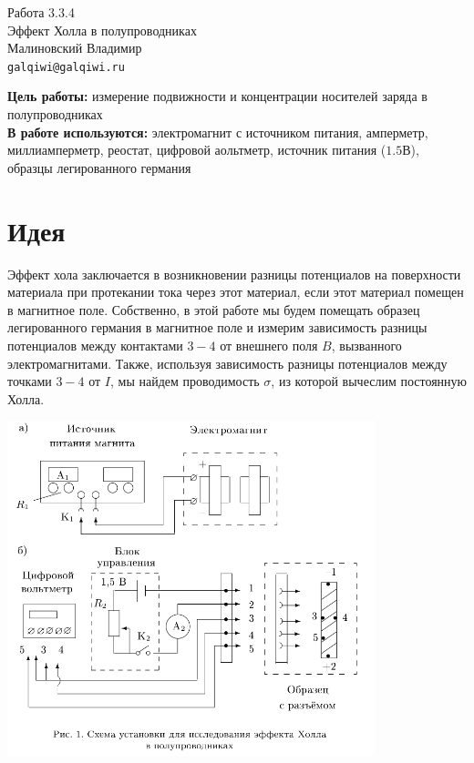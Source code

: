 



\begin{center}
  \LARGE{Работа 3.3.4}\\[0.2cm]
  \LARGE{Эффект Холла в полупроводниках}\\[0.2cm]
  \large{Малиновский Владимир}\\[0.2cm]
  \normalsize{\texttt{galqiwi@galqiwi.ru}}
\end{center}

\textbf{Цель работы:} измерение подвижности и концентрации носителей заряда в полупроводниках\\
\textbf{В работе используются:} электромагнит с источником питания, амперметр, миллиамперметр, реостат, цифровой аольтметр, источник питания ($1.5 \text{В}$), образцы легированного германия\\
\section*{Идея}
Эффект хола заключается в возникновении разницы потенциалов на поверхности материала при протекании тока через этот материал, если этот материал помещен в магнитное поле. Собственно, в этой работе мы будем помещать образец легированного германия в магнитное поле и измерим зависимость разницы потенциалов между контактами $3-4$ от внешнего поля $B$, вызванного электромагнитами. Также, используя зависимость разницы потенциалов между точками $3-4$ от $I$, мы найдем проводимость $\sigma$, из которой вычеслим постоянную Холла.

\begin{center}
\includegraphics[width=0.80\textwidth]{setup.png}
\end{center}

